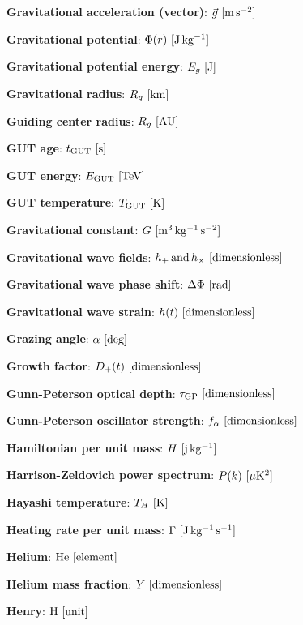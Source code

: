 \documentclass[a4paper,10pt]{article}
\begin{document}
{\noindent}\textbf{Gravitational acceleration (vector)}: $\vec{g} ~ [{\rm m\,s^{-2}}]$

{\noindent}\textbf{Gravitational potential}: $\Phi(r) ~ [{\rm J\,kg^{-1}}]$

{\noindent}\textbf{Gravitational potential energy}: $E_g ~ [{\rm J}]$

{\noindent}\textbf{Gravitational radius}: $R_g ~ [{\rm km}]$

{\noindent}\textbf{Guiding center radius}: $R_g ~ [{\rm AU}]$

{\noindent}\textbf{GUT age}: $t_\mathrm{GUT} ~ [{\rm s}]$

{\noindent}\textbf{GUT energy}: $E_\mathrm{GUT} ~ [{\rm TeV}]$

{\noindent}\textbf{GUT temperature}: $T_\mathrm{GUT} ~ [{\rm K}]$

{\noindent}\textbf{Gravitational constant}: $G ~ [{\rm m^3\,kg^{-1}\,s^{-2}}]$

{\noindent}\textbf{Gravitational wave fields}: $h_+\,{\rm and}\,h_\times ~
[{\rm dimensionless}]$

{\noindent}\textbf{Gravitational wave phase shift}: $\Delta\Phi ~ [{\rm rad}]$

{\noindent}\textbf{Gravitational wave strain}: $h(t) ~ [{\rm dimensionless}]$

{\noindent}\textbf{Grazing angle}: $\alpha ~ [{\rm deg}]$

{\noindent}\textbf{Growth factor}: $D_+(t) ~ [{\rm dimensionless}]$

{\noindent}\textbf{Gunn-Peterson optical depth}: $\tau_\mathrm{GP} ~ [{\rm dimensionless}]$

{\noindent}\textbf{Gunn-Peterson oscillator strength}: $f_\alpha ~ [{\rm dimensionless}]$

{\noindent}\textbf{Hamiltonian per unit mass}: $H ~ [{\rm j\,kg^{-1}}]$

{\noindent}\textbf{Harrison-Zeldovich power spectrum}: $P(k) ~ [{\rm \mu K^2}]$

{\noindent}\textbf{Hayashi temperature}: $T_H ~ [{\rm K}]$

{\noindent}\textbf{Heating rate per unit mass}: $\Gamma ~ [{\rm J\,kg^{-1}\,s^{-1}}]$

{\noindent}\textbf{Helium}: ${\rm He} ~ [{\rm element}]$

{\noindent}\textbf{Helium mass fraction}: $Y ~ [{\rm dimensionless}]$

{\noindent}\textbf{Henry}: ${\rm H} ~ [{\rm unit}]$
\end{document}
